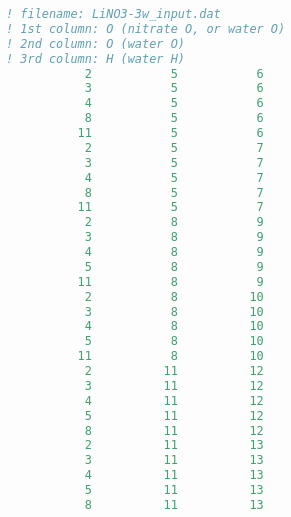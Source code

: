 \begin{lstlisting}[language=fortran]                  
! filename: LiNO3-3w_input.dat
! 1st column: O (nitrate O, or water O)
! 2nd column: O (water O)
! 3rd column: H (water H)
           2           5           6
           3           5           6
           4           5           6
           8           5           6
          11           5           6
           2           5           7
           3           5           7
           4           5           7
           8           5           7
          11           5           7
           2           8           9
           3           8           9
           4           8           9
           5           8           9
          11           8           9
           2           8          10
           3           8          10
           4           8          10
           5           8          10
          11           8          10
           2          11          12
           3          11          12
           4          11          12
           5          11          12
           8          11          12
           2          11          13
           3          11          13
           4          11          13
           5          11          13
           8          11          13
\end{lstlisting}
%


